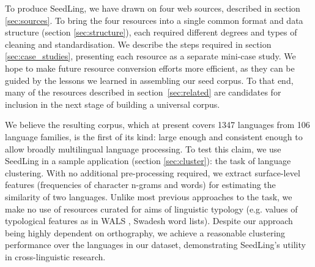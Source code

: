 To produce SeedLing, we have drawn on four web sources, described in section \ref{sec:sources}. To bring the four resources into a single common format and data structure (section \ref{sec:structure}), each required different degrees and types of cleaning and standardisation. We describe the steps required in section \ref{sec:case_studies}, presenting each resource as a separate mini-case study. We hope to make future resource conversion efforts more efficient, as they can be guided by the lessons we learned in assembling our seed corpus. To that end, many of the resources described in section~\ref{sec:related} are candidates for inclusion in the next stage of building a universal corpus.

We believe the resulting corpus, which at present covers 1347 languages from 106 language families, is the first of its kind: large enough and consistent enough to allow broadly multilingual language processing. To test this claim, we use SeedLing in a sample application (section \ref{sec:cluster}): the task of language clustering. With no additional pre-processing required, we extract surface-level features (frequencies of character n-grams and words) for estimating the similarity of two languages. Unlike most previous approaches to the task, we make no use of resources curated for aims of linguistic typology (e.g. values of typological features as in WALS \cite{wals}, Swadesh word lists). Despite our approach being highly dependent on orthography, we achieve a reasonable clustering performance over the languages in our dataset, demonstrating SeedLing's utility in cross-linguistic research. 





